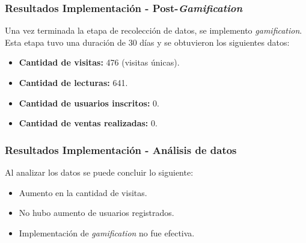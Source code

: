 \documentclass[10pt, compress]{beamer}
\begin{document}
\begin{frame}
 \frametitle{Resultados Implementación - Post-\emph{Gamification}}

Una vez terminada la etapa de recolección de datos, se implemento \emph{gamification}. Esta
etapa tuvo una duración de $30$ días y se obtuvieron los siguientes datos:

\begin{itemize}
    \item \textbf{Cantidad de visitas:} 476 (visitas únicas).
    \item \textbf{Cantidad de lecturas:} 641.
    \item \textbf{Cantidad de usuarios inscritos:} 0.
    \item \textbf{Cantidad de ventas realizadas:} 0.
\end{itemize}

\end{frame}


\begin{frame}
 \frametitle{Resultados Implementación - Análisis de datos}

Al analizar los datos se puede concluir lo siguiente:

\begin{itemize}[<+- | alert@+>]
 \item Aumento en la cantidad de visitas.
 \item No hubo aumento de usuarios registrados.
 \item Implementación de \emph{gamification} no fue efectiva.
\end{itemize}

\begin{table}[h]
\footnotesize
\centering
{}
\caption{Datos Pre y Post implementación.}
\label{tab:tam_empresa}
\end{table}

\end{frame}
\end{document}
